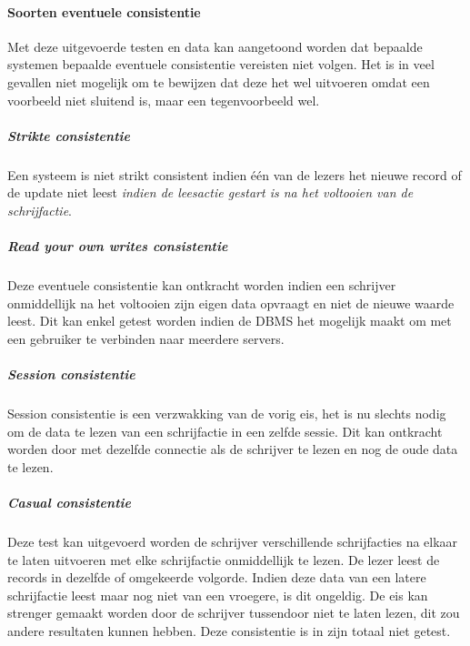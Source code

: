 \paragraph{Soorten eventuele consistentie} Met deze uitgevoerde testen en data kan aangetoond worden dat bepaalde systemen bepaalde eventuele consistentie vereisten niet volgen. Het is in veel gevallen niet mogelijk om te bewijzen dat deze het wel uitvoeren omdat een voorbeeld niet sluitend is, maar een tegenvoorbeeld wel. 

\subparagraph{Strikte consistentie} Een systeem is niet strikt consistent indien één van de lezers het nieuwe record of de update niet leest \textit{indien de leesactie gestart is na het voltooien van de schrijfactie}. 


\subparagraph{Read your own writes consistentie} Deze eventuele consistentie kan ontkracht worden indien een schrijver onmiddellijk na het voltooien zijn eigen data opvraagt en niet de nieuwe waarde leest. Dit kan enkel getest worden indien de DBMS het mogelijk maakt om met een gebruiker te verbinden naar meerdere servers. 

\subparagraph{Session consistentie} Session consistentie is een verzwakking van de vorig eis, het is nu slechts nodig om de data te lezen van een schrijfactie in een zelfde sessie. Dit kan ontkracht worden door met dezelfde connectie als de schrijver te lezen en nog de oude data te lezen. 

\subparagraph{Casual consistentie} Deze test kan uitgevoerd worden de schrijver verschillende schrijfacties na elkaar te laten uitvoeren met elke schrijfactie onmiddellijk te lezen. De lezer leest de records in dezelfde of omgekeerde volgorde. Indien deze data van een latere schrijfactie leest maar nog niet van een vroegere, is dit ongeldig. De eis kan strenger gemaakt worden door de schrijver tussendoor niet te laten lezen, dit zou andere resultaten kunnen hebben. Deze consistentie is in zijn totaal niet getest. 

